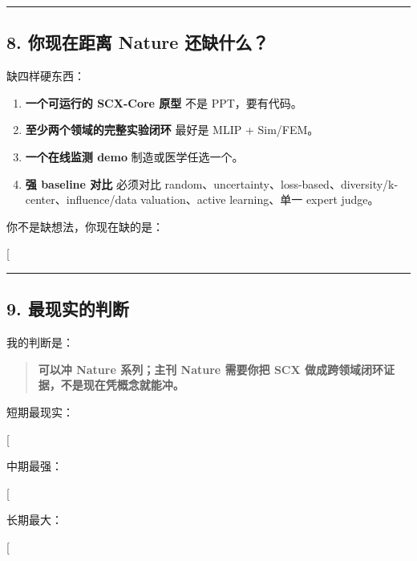 \documentclass[
  12pt,
]{ctexart}
\begin{document}
\begin{center}\rule{0.5\linewidth}{0.5pt}\end{center}

\subsection{8. 你现在距离 Nature
还缺什么？}\label{ux4f60ux73b0ux5728ux8dddux79bb-nature-ux8fd8ux7f3aux4ec0ux4e48}

缺四样硬东西：

\begin{enumerate}
\def\labelenumi{\arabic{enumi}.}
\item
  \textbf{一个可运行的 SCX-Core 原型} 不是 PPT，要有代码。
\item
  \textbf{至少两个领域的完整实验闭环} 最好是 MLIP + Sim/FEM。
\item
  \textbf{一个在线监测 demo} 制造或医学任选一个。
\item
  \textbf{强 baseline 对比} 必须对比
  random、uncertainty、loss-based、diversity/k-center、influence/data
  valuation、active learning、单一 expert judge。
\end{enumerate}

你不是缺想法，你现在缺的是：

{[} \text{evidence}{]}

\begin{center}\rule{0.5\linewidth}{0.5pt}\end{center}

\subsection{9. 最现实的判断}\label{ux6700ux73b0ux5b9eux7684ux5224ux65ad}

我的判断是：

\begin{quote}
\textbf{可以冲 Nature 系列；主刊 Nature 需要你把 SCX
做成跨领域闭环证据，不是现在凭概念就能冲。}
\end{quote}

短期最现实：

{[}  \rightarrow
\text{npj Computational Materials / Nature Communications}{]}

中期最强：

{[}  \rightarrow
\text{Nature Computational Science}{]}

长期最大：

{[}  \rightarrow
\text{Nature / Nature Machine Intelligence}{]}
\end{document}
